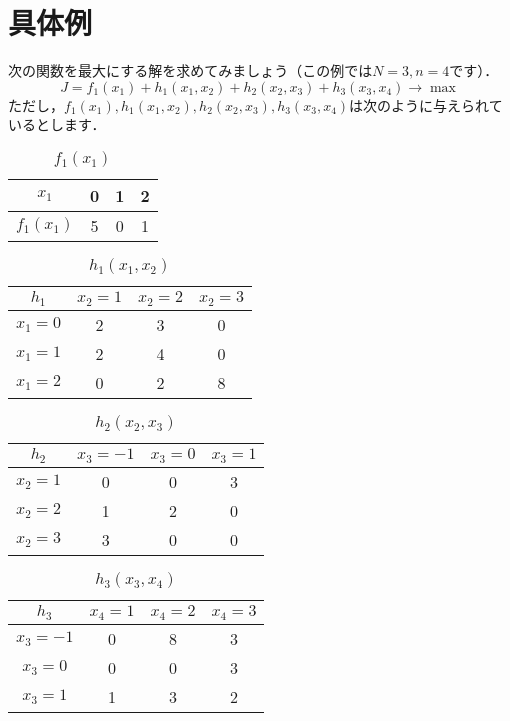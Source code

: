 \documentclass[a5paper]{jarticle}
\begin{document}
\section{具体例}
次の関数を最大にする解を求めてみましょう（この例では$N = 3, n = 4$です）．
\[
J = f_1(x_1) + h_1(x_1, x_2) + h_2(x_2, x_3) + h_3(x_3, x_4) \rightarrow \max
\]
ただし，$f_1(x_1), h_1(x_1, x_2), h_2(x_2, x_3), h_3(x_3, x_4)$は次のように与えられているとします．
\begin{table}[H]
\begin{center}
\caption{$f_1(x_1)$}
  \begin{tabular}{|c||c|c|c|} \hline
    $x_1$ & 0 & 1 & 2 \\ \hline \hline
    $f_1(x_1)$ & 5 & 0 & 1 \\ \hline
  \end{tabular}
  \end{center}
\end{table}
\begin{table}[H]
\begin{center}
\caption{$h_1(x_1, x_2)$}
  \begin{tabular}{|c||c|c|c|} \hline
    $h_1$ & $x_2 = 1$ & $x_2 = 2$ & $x_2 = 3$ \\ \hline \hline
    $x_1 = 0$ & 2 & 3 & 0 \\
    $x_1 = 1$ & 2 & 4 & 0 \\
    $x_1 = 2$ & 0 & 2 & 8 \\ \hline
  \end{tabular}
  \end{center}
\end{table}
\begin{table}[H]
\begin{center}
\caption{$h_2(x_2, x_3)$}
  \begin{tabular}{|c||c|c|c|} \hline
    $h_2$ & $x_3 = -1$ & $x_3 = 0$ & $x_3 = 1$ \\ \hline \hline
    $x_2 = 1$ & 0 & 0 & 3 \\
    $x_2 = 2$ & 1 & 2 & 0 \\
    $x_2 = 3$ & 3 & 0 & 0 \\ \hline
  \end{tabular}
  \end{center}
\end{table}
\begin{table}[H]
\begin{center}
\caption{$h_3(x_3, x_4)$}
  \begin{tabular}{|c||c|c|c|} \hline
    $h_3$ & $x_4 = 1$ & $x_4 = 2$ & $x_4 = 3$ \\ \hline \hline
    $x_3 = -1$ & 0 & 8 & 3 \\
    $x_3 = 0$ & 0 & 0 & 3 \\
    $x_3 = 1$ & 1 & 3 & 2 \\ \hline
  \end{tabular}
  \end{center}
\end{table}
\end{document}
